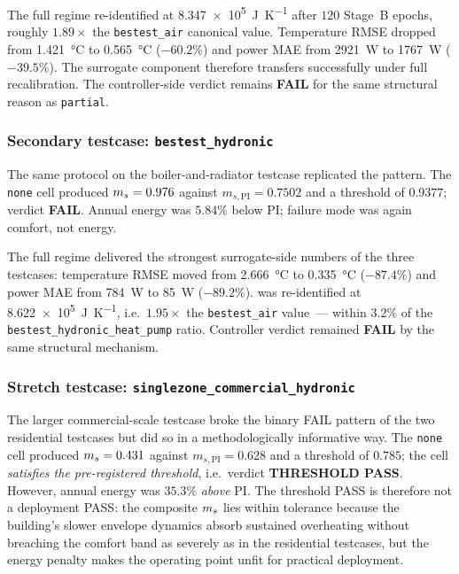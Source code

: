 The full regime re-identified \czon{} at
\SI{8.347e5}{\joule\per\kelvin} after $120$ Stage~B epochs, roughly
$1.89\times$ the \texttt{bestest\_air} canonical value. Temperature RMSE
dropped from \SI{1.421}{\celsius} to \SI{0.565}{\celsius} ($-60.2\%$) and
power MAE from \SI{2921}{\watt} to \SI{1767}{\watt} ($-39.5\%$). The
surrogate component therefore transfers successfully under full
recalibration. The controller-side verdict remains \textbf{FAIL} for the
same structural reason as \texttt{partial}.

\subsubsection{Secondary testcase: \texttt{bestest\_hydronic}}

The same protocol on the boiler-and-radiator testcase replicated the
pattern. The \texttt{none} cell produced \(m_s = 0.976\) against
\(m_{s,\mathrm{PI}} = 0.7502\) and a threshold of $0.9377$;
verdict \textbf{FAIL}. Annual energy was $5.84\%$ below PI; failure mode
was again comfort, not energy.

The full regime delivered the strongest surrogate-side numbers of the
three testcases: temperature RMSE moved from \SI{2.666}{\celsius} to
\SI{0.335}{\celsius} ($-87.4\%$) and power MAE from \SI{784}{\watt} to
\SI{85}{\watt} ($-89.2\%$). \czon{} was re-identified at
\SI{8.622e5}{\joule\per\kelvin}, i.e.\ $1.95\times$ the
\texttt{bestest\_air} value~--- within $3.2\%$ of the
\texttt{bestest\_hydronic\_heat\_pump} ratio. Controller verdict remained
\textbf{FAIL} by the same structural mechanism.

\subsubsection{Stretch testcase: \texttt{singlezone\_commercial\_hydronic}}

The larger commercial-scale testcase broke the binary FAIL pattern of the
two residential testcases but did so in a methodologically informative
way. The \texttt{none} cell produced \(m_s = 0.431\) against
\(m_{s,\mathrm{PI}} = 0.628\) and a threshold of $0.785$; the cell
\emph{satisfies the pre-registered threshold}, i.e.\ verdict
\textbf{THRESHOLD PASS}. However, annual energy was $35.3\%$
\emph{above} PI. The threshold PASS is therefore not a deployment PASS:
the composite \(m_s\) lies within tolerance because the building's
slower envelope dynamics absorb sustained overheating without breaching
the comfort band as severely as in the residential testcases, but the
energy penalty makes the operating point unfit for practical deployment.

